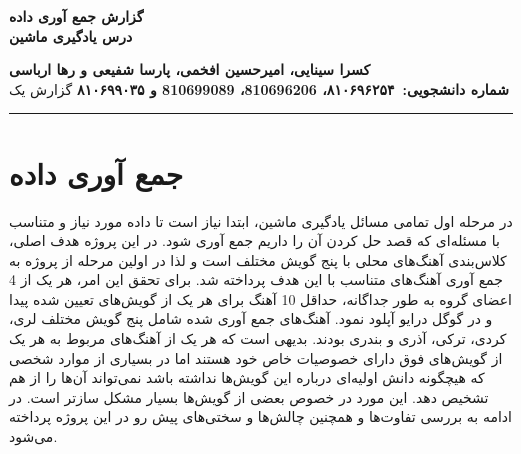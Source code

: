 
\def \Subject {گزارش جمع آوری داده }
\def \Course {درس یادگیری ماشین}
\def \Author {کسرا سینایی، امیرحسین افخمی، پارسا شفیعی و رها ارباسی }
\def \Report {گزارش یک}
\def \StudentNumber {۸۱۰۶۹۶۲۵۴، 810696206، 810699089 و ۸۱۰۶۹۹۰۳۵}

\begin{center}
\vspace{.4cm}
{\bf {\huge \Subject}}\\
{\bf \Large \Course}
\vspace{.2cm}
\end{center}
{\bf \Author }  \\
{\bf شماره دانشجویی:\ \StudentNumber}
\hspace{\fill} 
{\Large \Report} \\
\hrule
\vspace{0.8cm}

\clearpage


\section{جمع آوری داده}
در مرحله اول تمامی مسائل یادگیری ماشین، ابتدا نیاز است تا داده مورد نیاز و متناسب با مسئله‌ای که قصد حل کردن آن را داریم جمع آوری شود.
در این پروژه هدف اصلی، کلاس‌بندی آهنگ‌های محلی با پنج گویش مختلف است و لذا در اولین مرحله از پروژه به جمع آوری آهنگ‌های متناسب با این هدف پرداخته شد.
برای تحقق این امر، هر یک از 4 اعضای گروه به طور جداگانه، حداقل 10 آهنگ برای هر یک از گویش‌های تعیین شده پیدا و در گوگل درایو آپلود نمود.
آهنگ‌های جمع آوری شده شامل پنج گویش مختلف لری، کردی، ترکی، آذری و بندری بودند.
بدیهی است که هر یک از آهنگ‌های مربوط به هر یک از گویش‌های فوق دارای خصوصیات خاص خود هستند اما در بسیاری از موارد شخصی که هیچگونه دانش اولیه‌ای درباره این گویش‌ها نداشته باشد
نمی‌تواند آن‌ها را از هم تشخیص دهد. این مورد در خصوص بعضی از گویش‌ها بسیار مشکل سازتر است. در ادامه به بررسی تفاوت‌ها و همچنین چالش‌ها و سختی‌های پیش رو در این پروژه پرداخته می‌شود.

